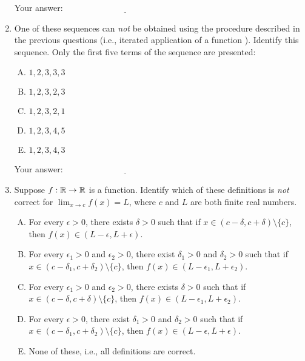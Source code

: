 \documentclass[10pt]{amsart}
\begin{document}
\begin{enumerate}
  \vspace{0.1in}
  Your answer: $\underline{\qquad\qquad\qquad\qquad\qquad\qquad\qquad}$
  \vspace{0.15in}

\item One of these sequences can {\em not} be obtained using the
  procedure described in the previous questions (i.e., iterated
  application of a function ). Identify this sequence. Only the first
  five terms of the sequence are presented:

  \begin{enumerate}[(A)]
  \item $1,2,3,3,3$
  \item $1,2,3,2,3$
  \item $1,2,3,2,1$
  \item $1,2,3,4,5$
  \item $1,2,3,4,3$
  \end{enumerate}

  \vspace{0.1in}
  Your answer: $\underline{\qquad\qquad\qquad\qquad\qquad\qquad\qquad}$
  \vspace{0.15in}

\item Suppose $f:\mathbb{R} \to \mathbb{R}$ is a function. Identify which of these
  definitions is {\em not} correct for $\lim_{x \to c} f(x) = L$,
  where $c$ and $L$ are both finite real numbers.
  \begin{enumerate}[(A)]
  \item For every $\epsilon > 0$, there exists $\delta > 0$ such that
    if $x \in (c - \delta, c + \delta) \setminus \{ c \}$, then $f(x)
    \in (L - \epsilon, L + \epsilon)$.
  \item For every $\epsilon_1 > 0$ and $\epsilon_2 > 0$, there exist
    $\delta_1 > 0$ and $\delta_2 > 0$ such that if $x \in (c -
    \delta_1,c+\delta_2)\setminus \{ c \}$, then $f(x) \in (L -
    \epsilon_1, L + \epsilon_2)$.
  \item For every $\epsilon_1 > 0$ and $\epsilon_2 > 0$, there exists
    $\delta > 0$ such that if $x \in (c - \delta, c + \delta)
    \setminus \{ c \}$, then $f(x) \in (L - \epsilon_1, L + \epsilon_2)$.
  \item For every $\epsilon > 0$, there exist $\delta_1 > 0$ and
    $\delta_2 > 0$ such that if $x \in (c - \delta_1, c + \delta_2)
    \setminus \{ c \}$, then $f(x) \in (L - \epsilon, L + \epsilon)$.
  \item None of these, i.e., all definitions are correct.
  \end{enumerate}


\end{enumerate}
\end{document}
